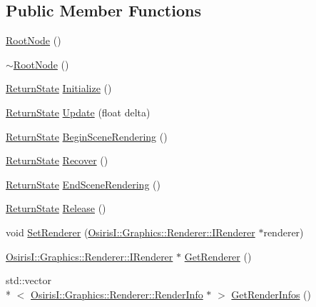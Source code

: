 \subsection*{Public Member Functions}
\begin{DoxyCompactItemize}
\item 
\hyperlink{class_osiris_i_1_1_graphics_1_1_scenes_1_1_root_node_a5a89c78d14e4a995ea1b0010371d5f0c}{Root\-Node} ()
\item 
\hyperlink{class_osiris_i_1_1_graphics_1_1_scenes_1_1_root_node_a77dd67b09fc5fd4df609af0ad6ee260a}{$\sim$\-Root\-Node} ()
\item 
\hyperlink{namespace_osiris_i_a8f53bf938dc75c65c6a529694514013e}{Return\-State} \hyperlink{class_osiris_i_1_1_graphics_1_1_scenes_1_1_root_node_acf22fd18d42ae8e33f717b2637ff5fd8}{Initialize} ()
\item 
\hyperlink{namespace_osiris_i_a8f53bf938dc75c65c6a529694514013e}{Return\-State} \hyperlink{class_osiris_i_1_1_graphics_1_1_scenes_1_1_root_node_a88960a325ef451de23082f7869694d07}{Update} (float delta)
\item 
\hyperlink{namespace_osiris_i_a8f53bf938dc75c65c6a529694514013e}{Return\-State} \hyperlink{class_osiris_i_1_1_graphics_1_1_scenes_1_1_root_node_a738c63ae74f314a8f16073b86b917077}{Begin\-Scene\-Rendering} ()
\item 
\hyperlink{namespace_osiris_i_a8f53bf938dc75c65c6a529694514013e}{Return\-State} \hyperlink{class_osiris_i_1_1_graphics_1_1_scenes_1_1_root_node_afaf7b7bd922406b940ab617cb0ccf1e8}{Recover} ()
\item 
\hyperlink{namespace_osiris_i_a8f53bf938dc75c65c6a529694514013e}{Return\-State} \hyperlink{class_osiris_i_1_1_graphics_1_1_scenes_1_1_root_node_a8a6c327695f97a6335c31f64eaa52c89}{End\-Scene\-Rendering} ()
\item 
\hyperlink{namespace_osiris_i_a8f53bf938dc75c65c6a529694514013e}{Return\-State} \hyperlink{class_osiris_i_1_1_graphics_1_1_scenes_1_1_root_node_a0b46b6f8bd5f7400ed678417ab686717}{Release} ()
\item 
void \hyperlink{class_osiris_i_1_1_graphics_1_1_scenes_1_1_root_node_a0733774b1a0fc56a139b3a928aebf0bb}{Set\-Renderer} (\hyperlink{class_osiris_i_1_1_graphics_1_1_renderer_1_1_i_renderer}{Osiris\-I\-::\-Graphics\-::\-Renderer\-::\-I\-Renderer} $\ast$renderer)
\item 
\hyperlink{class_osiris_i_1_1_graphics_1_1_renderer_1_1_i_renderer}{Osiris\-I\-::\-Graphics\-::\-Renderer\-::\-I\-Renderer} $\ast$ \hyperlink{class_osiris_i_1_1_graphics_1_1_scenes_1_1_root_node_a3b3bb260b7a02d0dd3c79d0569a8f61a}{Get\-Renderer} ()
\item 
std\-::vector\\*
$<$ \hyperlink{struct_osiris_i_1_1_graphics_1_1_renderer_1_1_render_info}{Osiris\-I\-::\-Graphics\-::\-Renderer\-::\-Render\-Info} $\ast$ $>$ \hyperlink{class_osiris_i_1_1_graphics_1_1_scenes_1_1_root_node_a44f9a582fd30625b07e39503bdaf521f}{Get\-Render\-Infos} ()
\end{DoxyCompactItemize}
